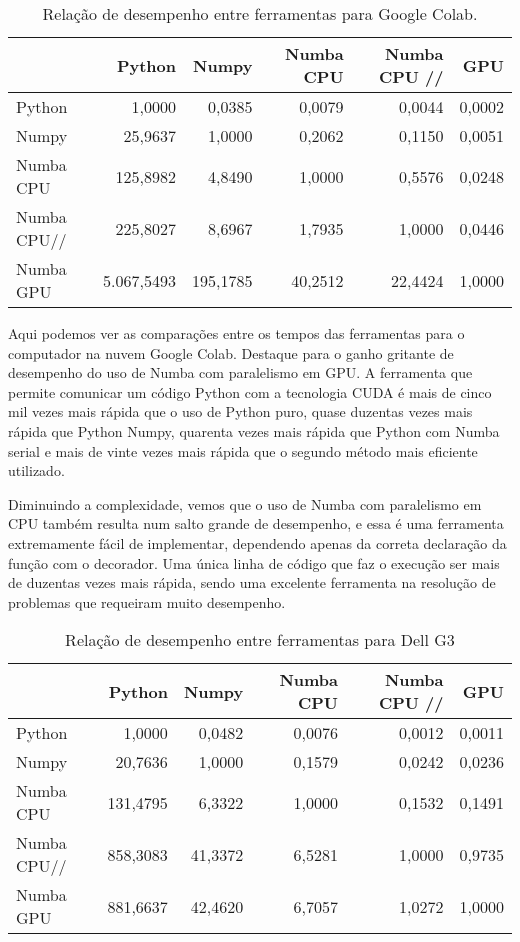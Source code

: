 \documentclass[
	12pt,				%
	a4paper,			%
	english,			%
	openright,				%
	brazil,				%
	oneside]{abntex2}
\begin{document}
\begin{table}[h]
	\begin{center}
		\begin{tabular}{lrrrrr}
			\hline
			  & Python & Numpy & Numba CPU &Numba CPU // &GPU\\
    		\hline
			Python& 1,0000 & 0,0385 & 0,0079 & 0,0044 & 0,0002\\
			Numpy& 25,9637 & 1,0000 & 0,2062 & 0,1150 & 0,0051\\
			Numba CPU& 125,8982 & 4,8490 &1,0000 & 0,5576 & 0,0248\\
			Numba CPU// & 225,8027 & 8,6967 & 1,7935 & 1,0000& 0,0446\\
			Numba GPU & 5.067,5493 & 195,1785  & 40,2512 & 22,4424 & 1,0000\\
			\hline
		\end{tabular}
	\end{center}
	\vspace{-.1cm}
	\caption{Relação de desempenho entre ferramentas para Google Colab.}
\end{table}

Aqui podemos ver as comparações entre os tempos das ferramentas para o computador na nuvem Google Colab. Destaque para o ganho gritante de desempenho do uso de Numba com paralelismo em GPU. A ferramenta que permite comunicar um código Python com a tecnologia CUDA é mais de cinco mil vezes mais rápida que o uso de Python puro, quase duzentas vezes mais rápida que Python Numpy, quarenta vezes mais rápida que Python com Numba serial e mais de vinte vezes mais rápida que o segundo método mais eficiente utilizado.

Diminuindo a complexidade, vemos que o uso de Numba com paralelismo em CPU também resulta num salto grande de desempenho, e essa é uma ferramenta extremamente fácil de implementar, dependendo apenas da correta declaração da função com o decorador. Uma única linha de código que faz o execução ser mais de duzentas vezes mais rápida, sendo uma excelente ferramenta na resolução de problemas que requeiram muito desempenho.

\begin{table}[h]
	\begin{center}
		\begin{tabular}{lrrrrr}
			\hline
			& Python & Numpy &Numba CPU &Numba CPU // & GPU\\
			\hline
			Python& 1,0000 & 0,0482 & 0,0076 & 0,0012 & 0,0011\\
  		    Numpy& 20,7636 & 1,0000 & 0,1579 & 0,0242 & 0,0236\\
			Numba CPU& 131,4795 & 6,3322 &1,0000 & 0,1532 & 0,1491\\
			Numba CPU// & 858,3083 & 41,3372 &6,5281 & 1,0000 & 0,9735\\
			Numba GPU  & 881,6637 & 42,4620 & 6,7057 & 1,0272 & 1,0000 \\
			\hline
		\end{tabular}
	\end{center}
	\vspace{-.1cm}
	\caption{Relação de desempenho entre ferramentas para Dell G3}
\end{table}
\end{document}

